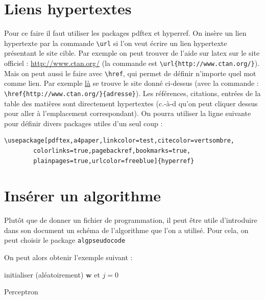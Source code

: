 \section{Liens hypertextes}

Pour ce faire il faut utiliser les packages pdftex et hyperref.
On insère un lien hypertexte par la commande 
\lstinline+\url+ si l'on veut écrire un lien 
hypertexte présentant le site cible. 
Par exemple on peut trouver de l'aide sur latex sur le site officiel : 
\url{http://www.ctan.org/} (la commande est \lstinline+\url{http://www.ctan.org/}+). 
Mais on peut aussi le faire avec  \lstinline+\href+, qui permet de définir n'importe quel mot 
comme lien. 
Par exemple \href{http://www.ctan.org/}{là} se trouve le site donné ci-dessus 
(avec la commande : \lstinline+\href{http://www.ctan.org/}{adresse}+).  
Les références, citations, entrées de la table des matières sont directement hypertextes 
(c.-à-d qu'on peut cliquer dessus pour aller à l'emplacement correspondant).
On pourra utiliser la ligne suivante pour définir divers packages utiles  d'un seul coup :
\begin{lstlisting}
\usepackage[pdftex,a4paper,linkcolor=test,citecolor=vertsombre,
	    colorlinks=true,pagebackref,bookmarks=true, 
	    plainpages=true,urlcolor=freeblue]{hyperref}
\end{lstlisting}

\section{Insérer un algorithme}
Plutôt que de donner un fichier de programmation, il peut être utile d'introduire dans son document
 un schéma de l'algorithme que l'on a utilisé. Pour cela, on peut choisir le package 
\lstinline+algpseudocode+

On peut alors obtenir  l'exemple suivant :\medskip 


\begin{algorithm}[h]
initialiser (aléatoirement) $\mathbf{w}$ et  $j=0$\\
\caption{Perceptron}
\end{algorithm}

